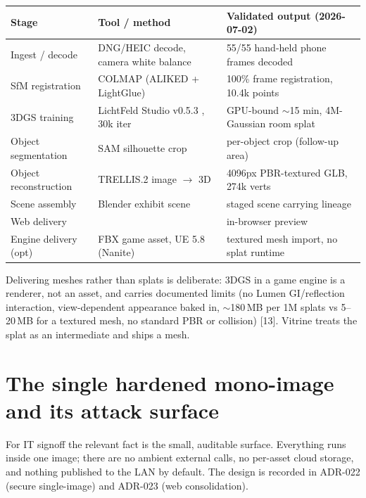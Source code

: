 \documentclass[a4paper,11pt]{article}
\begin{document}
\begin{center}\small
\begin{tabularx}{\textwidth}{@{}L{3.3cm} L{5.0cm} X@{}}
\toprule
\textbf{Stage} & \textbf{Tool / method} & \textbf{Validated output (2026-07-02)} \\
\midrule
Ingest / decode      & DNG/HEIC decode, camera white balance        & 55/55 hand-held phone frames decoded \\
SfM registration     & COLMAP (ALIKED + LightGlue)                   & 100\% frame registration, 10.4k points \\
3DGS training        & LichtFeld Studio v0.5.3 , 30k iter & GPU-bound $\sim$15 min, 4M-Gaussian room splat \\
Object segmentation  & SAM silhouette crop                           & per-object crop (follow-up area) \\
Object reconstruction& TRELLIS.2 image $\to$ 3D                       & 4096px PBR-textured GLB, 274k verts \\
Scene assembly       & Blender exhibit scene                         & staged scene carrying  lineage \\
Web delivery         &                           & in-browser preview \\
Engine delivery (opt)& FBX game asset, UE 5.8 (Nanite)               & textured mesh import, no splat runtime \\
\bottomrule
\end{tabularx}
\end{center}

Delivering meshes rather than splats is deliberate: 3DGS in a game engine is a renderer, not
an asset, and carries documented limits (no Lumen GI/reflection interaction, view-dependent
appearance baked in, $\sim$180\,MB per 1M splats vs 5--20\,MB for a textured mesh, no standard
PBR or collision) [13]. Vitrine treats the splat as an intermediate and ships a mesh.

\section{The single hardened mono-image and its attack surface}

For IT signoff the relevant fact is the small, auditable surface. Everything runs inside one
image; there are no ambient external calls, no per-asset cloud storage, and nothing published
to the LAN by default. The design is recorded in ADR-022 (secure single-image) and ADR-023
(web consolidation).
\end{document}
